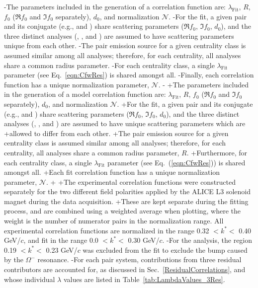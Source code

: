 \begin{table}[htbp]
-The parameters included in the generation of a correlation function are: $\lambda_{\mathrm{Fit}}$, $R$, $f_{0}$ ($\Re f_{0}$ and $\Im f_{0}$ separately), $d_{0}$, and normalization $\mathcal{N}$.
-For the fit, a given pair and its conjugate (e.g., \LamKchP and \ALamKchM) share scattering parameters ($\Re f_{0}$, $\Im f_{0}$, $d_{0}$), and the three distinct analyses (\LamKchP, \LamKchM, and \LamKs) are assumed to have scattering parameters unique from each other.
-The pair emission source for a given centrality class is assumed similar among all analyses; therefore, for each centrality, all \LamK analyses share a common radius parameter.
-For each centrality class, a single $\lambda_{\mathrm{Fit}}$ parameter (see Eq.~\ref{eqn:CfwRes}) is shared amongst all.
-Finally, each correlation function has a unique normalization parameter, $\mathcal{N}$.
-
+The parameters included in the generation of a model correlation function are: $\lambda_{\mathrm{Fit}}$, $R$, $f_{0}$ ($\Re f_{0}$ and $\Im f_{0}$ separately), $d_{0}$, and normalization $\mathcal{N}$.
+For the fit, a given pair and its conjugate (e.g., \LamKchP and \ALamKchM) share scattering parameters ($\Re f_{0}$, $\Im f_{0}$, $d_{0}$), and the three distinct analyses (\LamKchP, \LamKchM, and \LamKs) are assumed to have unique scattering parameters which are
+allowed to differ from each other.
+The pair emission source for a given centrality class is assumed similar among all analyses; therefore, for each centrality, all \LamK analyses share a common radius parameter, $R$.
+Furthermore, for each centrality class, a single $\lambda_{\mathrm{Fit}}$ parameter (see Eq.~(\ref{eqn:CfwRes})) is shared amongst all.
+Each fit correlation function has a unique normalization parameter, $\mathcal{N}$.
+
+The experimental correlation functions were constructed separately for the two different field polarities applied by the ALICE L3 solenoid magnet during the data acquisition.
+These are kept separate during the fitting process, and are combined using a weighted average when plotting, where the weight is the number of numerator pairs in the normalization range.
 All experimental correlation functions are normalized in the range 0.32 $< k^{*} <$ 0.40 GeV/$c$, and fit in the range 0.0 $< k^{*} <$ 0.30 GeV/$c$.
-For the \LamKchM analysis, the region 0.19 $< k^{*} <$ 0.23 GeV/$c$ was excluded from the fit to exclude the bump caused by the $\Omega^{-}$ resonance.
-For each pair system, contributions from three residual contributors are accounted for, as discussed in Sec.~\ref{ResidualCorrelations}, and whose individual $\lambda$ values are listed in Table~\ref{tab:LambdaValues_3Res}.

\end{table}
